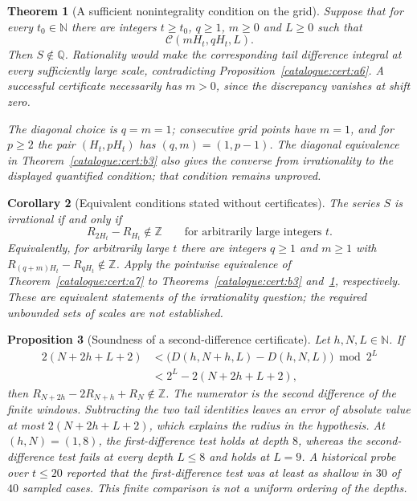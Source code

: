 \documentclass[11pt]{article}
\theoremstyle{plain}
\newtheorem{thm}{Theorem}[section]
\newtheorem{prop}[thm]{Proposition}
\newtheorem{cor}[thm]{Corollary}
\theoremstyle{definition}
\theoremstyle{remark}
\newcommand{\N}{\mathbb{N}}
\begin{document}
\begin{thm}[A sufficient nonintegrality condition on the grid]\label{catalogue:cert:b7}
Suppose that for every $t_0\in\N$ there are integers
$t\ge t_0$, $q\ge1$, $m\ge0$ and $L\ge0$ such that
\[
 \mathcal C(mH_t,qH_t,L).
\]
Then $S\notin\mathbb Q$. Rationality would make the corresponding
tail difference integral at every sufficiently large scale, contradicting
Proposition~\ref{catalogue:cert:a6}. A successful certificate necessarily
has $m>0$, since the discrepancy vanishes at shift zero.

The diagonal choice is $q=m=1$; consecutive grid points have $m=1$,
and for $p\ge2$ the pair $(H_t,pH_t)$ has $(q,m)=(1,p-1)$. The diagonal equivalence
in Theorem~\ref{catalogue:cert:b3} also gives the converse from
irrationality to the displayed quantified condition; that condition remains unproved.
\end{thm}

\begin{cor}[Equivalent conditions stated without certificates]\label{catalogue:cert:b8}
The series $S$ is irrational if and only if
\[
 R_{2H_t}-R_{H_t}\notin\mathbb Z
 \qquad\text{for arbitrarily large integers }t.
\]
Equivalently, for arbitrarily large $t$ there are integers $q\ge1$
and $m\ge1$ with $R_{(q+m)H_t}-R_{qH_t}\notin\mathbb Z$.
Apply the pointwise equivalence of Theorem~\ref{catalogue:cert:a7}
to Theorems~\ref{catalogue:cert:b3} and~\ref{catalogue:cert:b7},
respectively. These are equivalent statements of the irrationality
question; the required unbounded sets of scales are not established.
\end{cor}

\begin{prop}[Soundness of a second-difference certificate]\label{catalogue:cert:b9a}
Let $h,N,L\in\mathbb N$. If
\[
\begin{aligned}
 2(N+2h+L+2)
 &<\bigl(D(h,N+h,L)-D(h,N,L)\bigr)\bmod2^L\\
 &<2^L-2(N+2h+L+2),
\end{aligned}
\]
then $R_{N+2h}-2R_{N+h}+R_N\notin\mathbb Z$.
The numerator is the second difference of the finite windows.
Subtracting the two tail identities leaves an error of absolute value
at most $2(N+2h+L+2)$, which explains the radius in the hypothesis.
At $(h,N)=(1,8)$, the first-difference test holds at depth $8$,
whereas the second-difference test fails at every depth $L\le8$
and holds at $L=9$. A historical probe over $t\le20$ reported that the
first-difference test was at least as shallow in $30$ of $40$ sampled
cases. This finite comparison is not a uniform ordering of the depths.
\end{prop}
\end{document}
